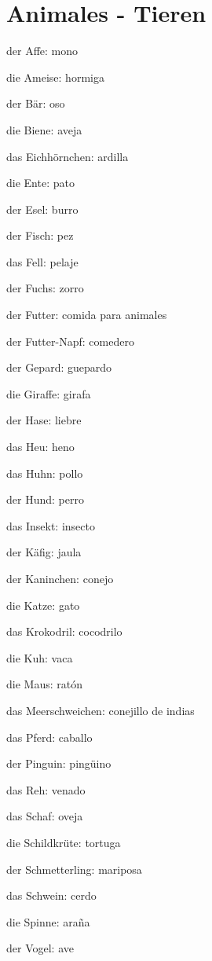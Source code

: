 \section{Animales - Tieren}
\begin{multicols}{3}
\begin{myitemize}
\item der Affe: mono
\item die Ameise: hormiga
\item der Bär: oso
\item die Biene: aveja
\item das Eichhörnchen: ardilla
\item die Ente: pato
\item der Esel: burro
\item der Fisch: pez
\item das Fell: pelaje
\item der Fuchs: zorro
\item der Futter: comida para animales
\item der Futter-Napf: comedero
\item der Gepard: guepardo
\item die Giraffe: girafa
\item der Hase: liebre
\item das Heu: heno
\item das Huhn: pollo
\item der Hund: perro
\item das Insekt: insecto
\item der Käfig: jaula
\item der Kaninchen: conejo
\item die Katze: gato
\item das Krokodril: cocodrilo
\item die Kuh: vaca
\item die Maus: ratón
\item das Meerschweichen: conejillo de indias
\item das Pferd: caballo
\item der Pinguin: pingüino
\item das Reh: venado
\item das Schaf: oveja
\item die Schildkrüte: tortuga
\item der Schmetterling: mariposa
\item das Schwein: cerdo
\item die Spinne: araña
\item der Vogel: ave
\end{myitemize}
\end{multicols}

